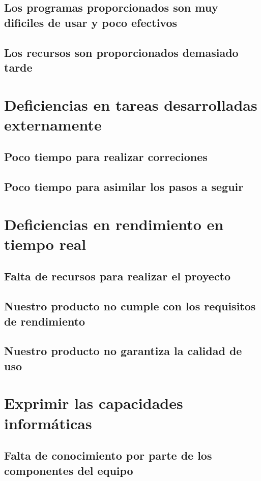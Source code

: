\documentclass[spanish,a4paper,12pt]{report}	%
\begin{document}
	\subsection{Los programas proporcionados son muy dificiles de usar y poco efectivos}

	\subsection{Los recursos son proporcionados demasiado tarde}


\section{Deficiencias en tareas desarrolladas externamente}
	
	\subsection{Poco tiempo para realizar correciones}

	\subsection{Poco tiempo para asimilar los pasos a seguir}


\section{Deficiencias en rendimiento en tiempo real}

	\subsection{Falta de recursos para realizar el proyecto}

	\subsection{Nuestro producto no cumple con los requisitos de rendimiento}

	\subsection{Nuestro producto no garantiza la calidad de uso}


\section{Exprimir las capacidades informáticas}
	\subsection{Falta de conocimiento por parte de los componentes del equipo}
\end{document}
